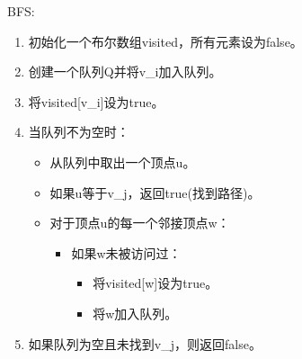 BFS:

\begin{enumerate}
	\item 初始化一个布尔数组visited，所有元素设为false。
	\item 创建一个队列Q并将v\_i加入队列。
	\item 将visited[v\_i]设为true。
	\item 当队列不为空时：
	\begin{itemize}
		\item 从队列中取出一个顶点u。
		\item 如果u等于v\_j，返回true(找到路径)。
		\item 对于顶点u的每一个邻接顶点w：
		\begin{itemize}
			\item 如果w未被访问过：
			\begin{itemize}
				\item 将visited[w]设为true。
				\item 将w加入队列。
			\end{itemize}
		\end{itemize}
	\end{itemize}
	\item 如果队列为空且未找到v\_j，则返回false。
\end{enumerate}
